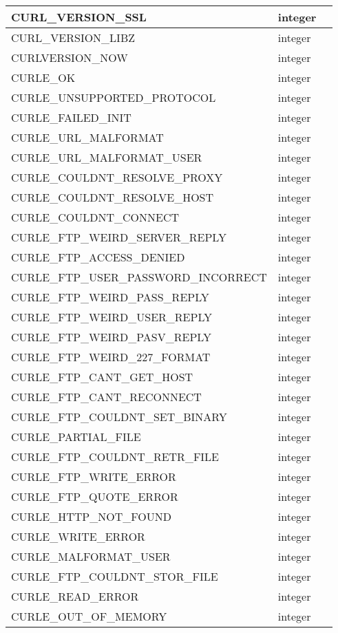 \begin{longtable}{|m{150pt}|m{40pt}|m{200pt}|}
\hline
CURL\_VERSION\_SSL&integer&\\
\hline
CURL\_VERSION\_LIBZ&integer&\\
\hline
CURLVERSION\_NOW&integer&\\
\hline
CURLE\_OK&integer&\\
\hline
CURLE\_UNSUPPORTED\_PROTOCOL&integer&\\
\hline
CURLE\_FAILED\_INIT&integer&\\
\hline
CURLE\_URL\_MALFORMAT&integer&\\
\hline
CURLE\_URL\_MALFORMAT\_USER&integer&\\
\hline
CURLE\_COULDNT\_RESOLVE\_PROXY&integer&\\
\hline
CURLE\_COULDNT\_RESOLVE\_HOST&integer&\\
\hline
CURLE\_COULDNT\_CONNECT&integer&\\
\hline
CURLE\_FTP\_WEIRD\_SERVER\_REPLY&integer&\\
\hline
CURLE\_FTP\_ACCESS\_DENIED&integer&\\
\hline
CURLE\_FTP\_USER\_PASSWORD\_INCORRECT&integer&\\
\hline
CURLE\_FTP\_WEIRD\_PASS\_REPLY&integer&\\
\hline
CURLE\_FTP\_WEIRD\_USER\_REPLY&integer&\\
\hline
CURLE\_FTP\_WEIRD\_PASV\_REPLY&integer&\\
\hline
CURLE\_FTP\_WEIRD\_227\_FORMAT&integer&\\
\hline
CURLE\_FTP\_CANT\_GET\_HOST&integer&\\
\hline
CURLE\_FTP\_CANT\_RECONNECT&integer&\\
\hline
CURLE\_FTP\_COULDNT\_SET\_BINARY&integer&\\
\hline
CURLE\_PARTIAL\_FILE&integer&\\
\hline
CURLE\_FTP\_COULDNT\_RETR\_FILE&integer&\\
\hline
CURLE\_FTP\_WRITE\_ERROR&integer&\\
\hline
CURLE\_FTP\_QUOTE\_ERROR&integer&\\
\hline
CURLE\_HTTP\_NOT\_FOUND&integer&\\
\hline
CURLE\_WRITE\_ERROR&integer&\\
\hline
CURLE\_MALFORMAT\_USER&integer&\\
\hline
CURLE\_FTP\_COULDNT\_STOR\_FILE&integer&\\
\hline
CURLE\_READ\_ERROR&integer&\\
\hline
CURLE\_OUT\_OF\_MEMORY&integer&\\

\end{longtable}
